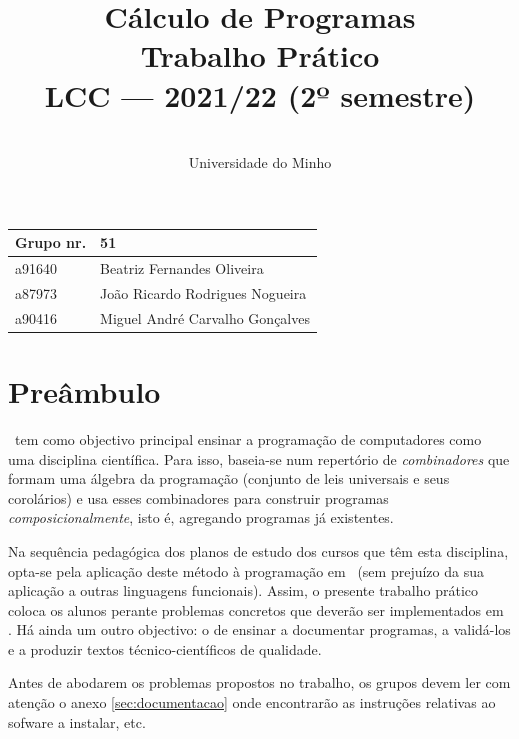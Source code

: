 \documentclass[a4paper]{article}
\title{
          Cálculo de Programas
\\
          Trabalho Prático
\\
          LCC --- 2021/22 (2º semestre)
}
\author{
          \dium
\\
          Universidade do Minho
}
\date\mydate
\begin{document}
\maketitle

\begin{center}\large
\begin{tabular}{ll}
\textbf{Grupo} nr. & 51 
\\\hline
a91640 & Beatriz Fernandes Oliveira
\\
a87973 & João Ricardo Rodrigues Nogueira
\\
a90416 & Miguel André Carvalho Gonçalves 
\end{tabular}
\end{center}

\section{Preâmbulo}

\CP\ tem como objectivo principal ensinar
a progra\-mação de computadores como uma disciplina científica. Para isso,
baseia-se num repertório de \emph{combinadores} que formam uma álgebra da
programação (conjunto de leis universais e seus corolários) e usa esses
combinadores para construir programas \emph{composicionalmente}, isto é,
agregando programas já existentes.

Na sequência pedagógica dos planos de estudo dos cursos que têm
esta disciplina, opta-se pela aplicação deste método à programação
em \Haskell\ (sem prejuízo da sua aplicação a outras linguagens
funcionais). Assim, o presente trabalho prático coloca os
alunos perante problemas concretos que deverão ser implementados em
\Haskell.  Há ainda um outro objectivo: o de ensinar a documentar
programas, a validá-los e a produzir textos técnico-científicos de
qualidade.

Antes de abodarem os problemas propostos no trabalho, os grupos devem ler
com atenção o anexo \ref{sec:documentacao} onde encontrarão as instruções
relativas ao sofware a instalar, etc.


\Problema
\end{document}
